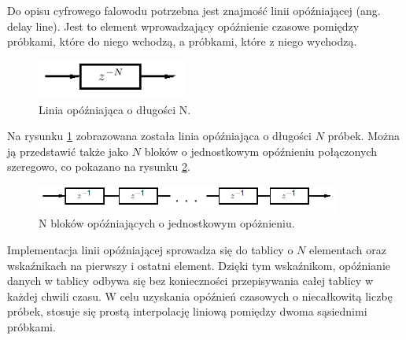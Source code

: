 Do opisu cyfrowego falowodu potrzebna jest znajmość linii opóźniającej (ang. delay line). Jest to element wprowadzający opóźnienie czasowe pomiędzy próbkami, które do niego wchodzą, a próbkami, które z niego wychodzą. 
\begin{figure}[H]
	\centering
	\includegraphics[width=5cm]{grafiki/linia}
	\captionsetup{justification=centering}
	\caption{Linia opóźniająca o długości N.}
	\label{rys:delay_line}
\end{figure}
Na rysunku \ref{rys:delay_line} zobrazowana została linia opóźniająca o długości $N$ próbek. Można ją przedstawić także jako $N$ bloków o jednostkowym opóźnieniu połączonych szeregowo, co pokazano na rysunku \ref{rys:model_delay_line2}.
\begin{figure}[H]
	\centering
	\includegraphics[width=10cm]{grafiki/model_linie}
	\captionsetup{justification=centering}
	\caption{N bloków opóźniających o jednostkowym opóżnieniu.}
	\label{rys:model_delay_line2}
\end{figure}
 Implementacja linii opóźniającej sprowadza się do tablicy o $N$ elementach oraz wskaźnikach na pierwszy i ostatni element. Dzięki tym wskaźnikom, opóźnianie danych w tablicy odbywa się bez konieczności przepisywania całej tablicy w każdej chwili czasu. W celu uzyskania opóźnień czasowych o niecałkowitą liczbę próbek, stosuje się prostą interpolację liniową pomiędzy dwoma sąsiednimi próbkami.


